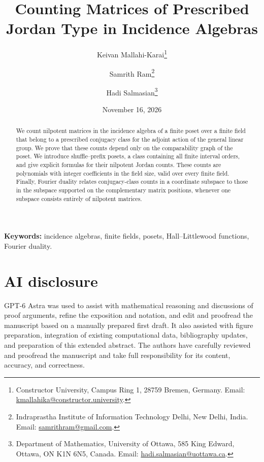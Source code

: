 \documentclass[12pt,letterpaper]{article}
\title{Counting Matrices of Prescribed Jordan Type in Incidence Algebras}
\author{Keivan Mallahi-Karai\thanks{Constructor University, Campus Ring 1, 28759 Bremen, Germany. Email: \href{mailto:kmallahika@constructor.university}{kmallahika@constructor.university}.}
\and Samrith Ram\thanks{Indraprastha Institute of Information Technology Delhi, New Delhi, India. Email: \href{mailto:samrithram@gmail.com}{samrithram@gmail.com}.}
\and Hadi Salmasian\thanks{Department of Mathematics, University of Ottawa, 585 King Edward, Ottawa, ON K1N 6N5, Canada. Email: \href{mailto:hadi.salmasian@uottawa.ca}{hadi.salmasian@uottawa.ca}.}}
\date{November 16, 2026}
\theoremstyle{definition}
\numberwithin{equation}{section}
\begin{document}
\maketitle
\begin{abstract}
We count nilpotent matrices in the incidence algebra of a finite poset over
a finite field that belong to a prescribed conjugacy class for the adjoint
action of the general linear group. We prove that these
counts depend only on the comparability graph of the poset. We introduce
shuffle--prefix posets, a class containing all finite interval orders, and
give explicit formulas for their nilpotent Jordan counts.
These counts are polynomials with integer coefficients in the field
size, valid over every finite field. Finally, Fourier duality relates
conjugacy-class counts in a coordinate subspace to those in the subspace
supported on the complementary matrix positions, whenever one subspace
consists entirely of nilpotent matrices.
\end{abstract}
\noindent\textbf{Keywords:} incidence algebras, finite fields, posets, Hall--Littlewood functions, Fourier duality.


\printbibliography
\label{end:main-draft}
\section*{AI disclosure}

GPT-6 Astra was used to assist with mathematical reasoning and discussions of proof arguments, refine the exposition and notation, and edit and proofread the manuscript based on a manually prepared first draft. It also assisted with figure preparation, integration of existing computational data, bibliography updates, and preparation of this extended abstract. The authors have carefully reviewed and proofread the manuscript and take full responsibility for its content, accuracy, and correctness.
\end{document}
